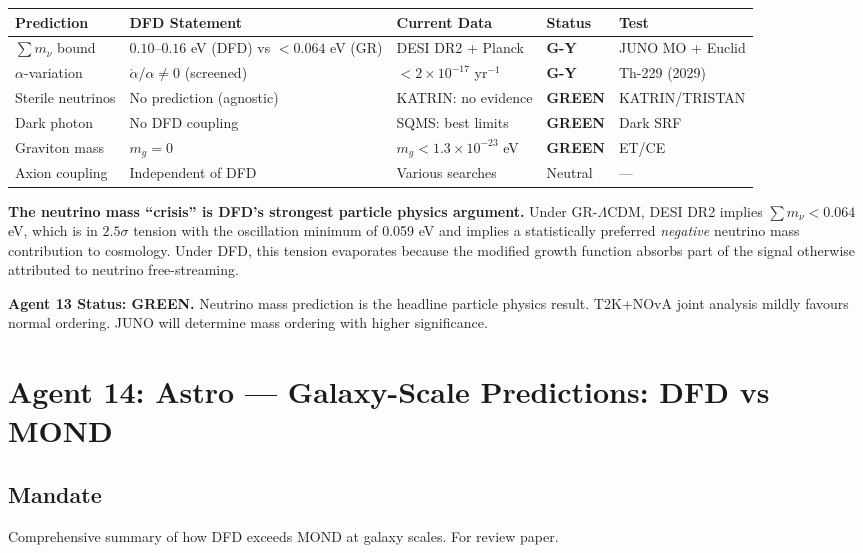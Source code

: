 \documentclass[11pt,a4paper]{article}
\newcommand{\GREEN}{\textcolor{dfdgreen}{\textbf{GREEN}}}
\newcommand{\GY}{\textcolor{dfdgy}{\textbf{G-Y}}}
\begin{document}
\begin{center}
\begin{longtable}{p{3.5cm}p{3.5cm}p{3cm}ll}
\toprule
\textbf{Prediction} & \textbf{DFD Statement} & \textbf{Current Data} & \textbf{Status} & \textbf{Test} \\
\midrule
\endfirsthead
$\sum m_\nu$ bound & $0.10$--$0.16$ eV (DFD) vs $< 0.064$ eV (GR) & DESI DR2 + Planck & \GY & JUNO MO + Euclid \\
$\alpha$-variation & $\dot\alpha/\alpha \neq 0$ (screened) & $< 2 \times 10^{-17}$ yr$^{-1}$ & \GY & Th-229 (2029) \\
Sterile neutrinos & No prediction (agnostic) & KATRIN: no evidence & \GREEN & KATRIN/TRISTAN \\
Dark photon & No DFD coupling & SQMS: best limits & \GREEN & Dark SRF \\
Graviton mass & $m_g = 0$ & $m_g < 1.3 \times 10^{-23}$ eV & \GREEN & ET/CE \\
Axion coupling & Independent of DFD & Various searches & Neutral & --- \\
\bottomrule
\end{longtable}
\end{center}

\textbf{The neutrino mass ``crisis'' is DFD's strongest particle physics argument.} Under GR-$\Lambda$CDM, DESI DR2 implies $\sum m_\nu < 0.064$ eV, which is in $2.5\sigma$ tension with the oscillation minimum of 0.059 eV and implies a statistically preferred \emph{negative} neutrino mass contribution to cosmology. Under DFD, this tension evaporates because the modified growth function absorbs part of the signal otherwise attributed to neutrino free-streaming.

\textbf{Agent 13 Status: \GREEN.} Neutrino mass prediction is the headline particle physics result. T2K+NOvA joint analysis mildly favours normal ordering. JUNO will determine mass ordering with higher significance.

\section{Agent 14: Astro --- Galaxy-Scale Predictions: DFD vs MOND}

\subsection{Mandate}
Comprehensive summary of how DFD exceeds MOND at galaxy scales. For review paper.
\end{document}
